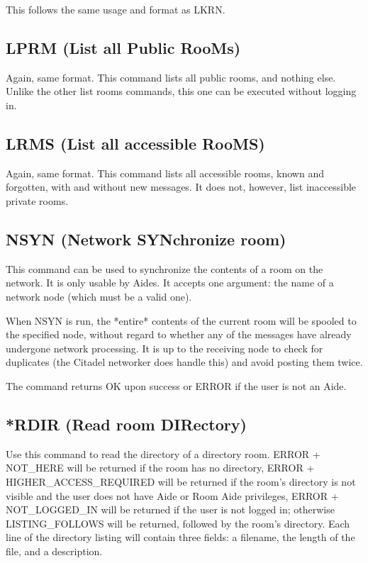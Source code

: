  This follows the same usage and format as LKRN.



\subsection{LPRM (List all Public RooMs)}

 Again, same format.  This command lists all public rooms, and nothing else.
Unlike the other list rooms commands, this one can be executed without logging
in.



\subsection{LRMS (List all accessible RooMS)}

 Again, same format.  This command lists all accessible rooms, known and
forgotten, with and without new messages.  It does not, however, list
inaccessible private rooms.



\subsection{NSYN (Network SYNchronize room)}

 This command can be used to synchronize the contents of a room on the
network.  It is only usable by Aides.  It accepts one argument: the name of
a network node (which must be a valid one).

 When NSYN is run, the *entire* contents of the current room will be spooled
to the specified node, without regard to whether any of the messages have
already undergone network processing.  It is up to the receiving node to
check for duplicates (the Citadel networker does handle this) and avoid
posting them twice.

 The command returns OK upon success or ERROR if the user is not an Aide.



\subsection{*RDIR (Read room DIRectory)}

 Use this command to read the directory of a directory room.  ERROR + NOT_HERE
will be returned if the room has no directory, ERROR + HIGHER_ACCESS_REQUIRED
will be returned if the room's directory is not visible and the user does not
have Aide or Room Aide privileges, ERROR + NOT_LOGGED_IN will be returned if
the user is not logged in; otherwise LISTING_FOLLOWS will be returned,
followed by the room's directory.  Each line of the directory listing will
contain three fields: a filename, the length of the file, and a description.

